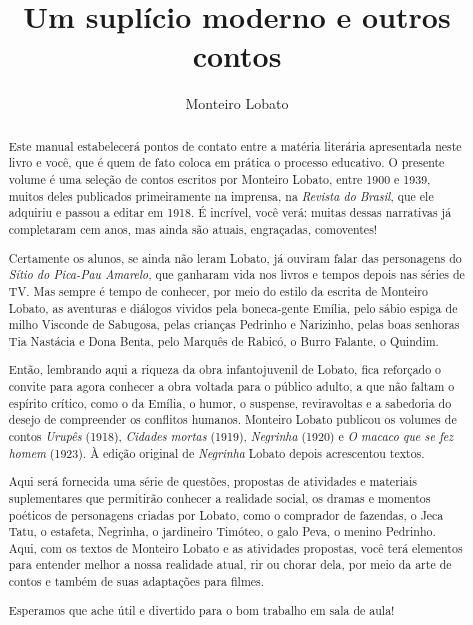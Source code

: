 \documentclass[11pt]{extarticle}
\begin{document}
\newcommand{\AutorLivro}{Monteiro Lobato}
\newcommand{\TituloLivro}{Um suplício moderno e outros contos}
\newcommand{\Tema}{Ficção, mistério e fantasia}
\newcommand{\Genero}{Conto, crônica e novela}
\newcommand{\imagemCapa}{./images/PNLD0024-01.png}
\newcommand{\issnppub}{---}
\newcommand{\issnepub}{---}
\newcommand{\colaborador}{{Ieda Lebensztayn}}


\title{\TituloLivro}
\author{\AutorLivro}
\def\authornotes{\colaborador}

\date{}
\maketitle

\begin{abstract}

Este manual estabelecerá pontos de contato entre a matéria literária
apresentada neste livro e você, que é quem de fato coloca em prática o
processo educativo. O presente volume é uma seleção de contos escritos
por Monteiro Lobato, entre 1900 e 1939, muitos deles publicados
primeiramente na imprensa, na \emph{Revista do Brasil}, que ele adquiriu
e passou a editar em 1918. É incrível, você verá: muitas dessas
narrativas já completaram cem anos, mas ainda são atuais, engraçadas,
comoventes!

Certamente os alunos, se ainda não leram Lobato, já ouviram falar das
personagens do \emph{Sítio do Pica-Pau Amarelo}, que ganharam vida nos
livros e tempos depois nas séries de TV. Mas sempre é tempo de conhecer,
por meio do estilo da escrita de Monteiro Lobato, as aventuras e
diálogos vividos pela boneca-gente Emília, pelo sábio espiga de milho
Visconde de Sabugosa, pelas crianças Pedrinho e Narizinho, pelas boas
senhoras Tia Nastácia e Dona Benta, pelo Marquês de Rabicó, o Burro
Falante, o Quindim.

Então, lembrando aqui a riqueza da obra infantojuvenil de Lobato, fica
reforçado o convite para agora conhecer a obra voltada para o público
adulto, a que não faltam o espírito crítico, como o da Emília, o humor,
o suspense, reviravoltas e a sabedoria do desejo de compreender os
conflitos humanos. Monteiro Lobato publicou os volumes de contos
\emph{Urupês} (1918), \emph{Cidades mortas} (1919), \emph{Negrinha}
(1920) e \emph{O macaco que se fez homem} (1923). À edição original de
\emph{Negrinha} Lobato depois acrescentou textos.

Aqui será fornecida uma série de questões, propostas de atividades e
materiais suplementares que permitirão conhecer a realidade social, os
dramas e momentos poéticos de personagens criadas por Lobato, como o
comprador de fazendas, o Jeca Tatu, o estafeta, Negrinha, o jardineiro
Timóteo, o galo Peva, o menino Pedrinho. Aqui, com os textos de Monteiro
Lobato e as atividades propostas, você terá elementos para entender
melhor a nossa realidade atual, rir ou chorar dela, por meio da arte de
contos e também de suas adaptações para filmes.

Esperamos que ache útil e divertido para o bom trabalho em sala de aula!
\end{abstract}
\end{document}

